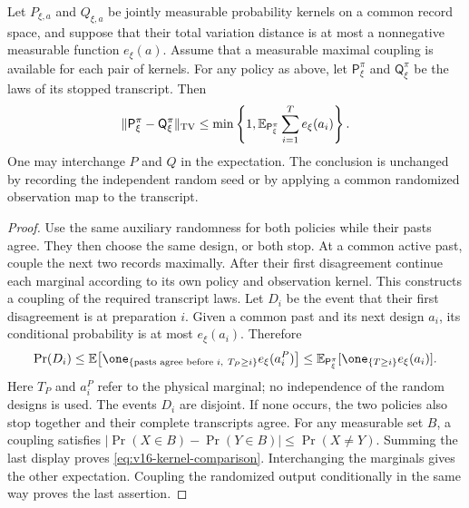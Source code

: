 \begin{lemma}
\label{lem:v16-kernel-comparison}
Let $P_{\xi,a}$ and $Q_{\xi,a}$ be jointly measurable probability
kernels on a common record space, and suppose that their total variation
distance is at most a nonnegative measurable function $e_\xi(a)$.
Assume that a measurable maximal coupling is available for each pair of
kernels. For any policy as above, let $\mathsf P_\xi^\pi$ and
$\mathsf Q_\xi^\pi$ be the laws of its stopped transcript. Then
\begin{equation}\label{eq:v16-kernel-comparison}
 \|\mathsf P_\xi^\pi-\mathsf Q_\xi^\pi\|_{\rm TV}
 \le \min\left\{1,
       \mathbb E_{\mathsf P_\xi^\pi}
          \sum_{i=1}^{T}e_\xi(a_i)\right\}.
\end{equation}
One may interchange $P$ and $Q$ in the expectation. The conclusion is
unchanged by recording the independent random seed or by applying a
common randomized observation map to the transcript.
\end{lemma}
\begin{proof}
Use the same auxiliary randomness for both policies while their pasts
agree. They then choose the same design, or both stop. At a common active
past, couple the next two records maximally. After their first disagreement
continue each marginal according to its own policy and observation
kernel. This constructs a coupling of the required transcript laws.
Let $D_i$ be the event that their first disagreement is at preparation
$i$. Given a common past and its next design $a_i$, its conditional
probability is at most $e_\xi(a_i)$. Therefore
\[
 \Pr(D_i)\le
 \mathbb E\bigl[\one_{\{\text{pasts agree before }i,\ T_P\ge i\}}
                         e_\xi(a_i^P)\bigr]
 \le \mathbb E_{\mathsf P_\xi^\pi}
                 [\one_{\{T\ge i\}}e_\xi(a_i)].
\]
Here $T_P$ and $a_i^P$ refer to the physical marginal; no independence
of the random designs is used. The events $D_i$ are disjoint. If none
occurs, the two policies also stop together and their complete transcripts
agree. For any measurable set $B$, a coupling satisfies
$|\Pr(X\in B)-\Pr(Y\in B)|\le\Pr(X\ne Y)$.
Summing the last display proves \eqref{eq:v16-kernel-comparison}.
Interchanging the marginals gives the other expectation. Coupling the
randomized output conditionally in the same way proves the last assertion.
\end{proof}

